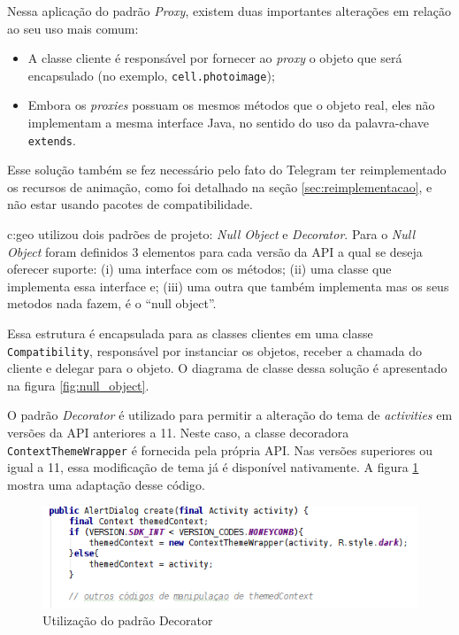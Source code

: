 Nessa aplicação do padrão \textit{Proxy}, existem duas importantes alterações em
relação ao seu uso mais comum:
\begin{itemize}
    \item A classe cliente é responsável por fornecer ao \textit{proxy} o objeto
        que será encapsulado (no exemplo, \texttt{cell.photoimage});
    \item Embora os \textit{proxies} possuam os mesmos métodos que o objeto real,
    eles não implementam a mesma interface Java, no sentido do uso da palavra-chave \texttt{extends}.
\end{itemize}

Esse solução também se fez necessário pelo fato do Telegram ter reimplementado os
recursos de animação, como foi detalhado na seção \ref{sec:reimplementacao},
e não estar usando pacotes de compatibilidade.

c:geo utilizou dois padrões de projeto: \textit{Null Object} e \textit{Decorator}.
Para o \textit{Null Object} foram definidos 3 elementos para cada versão da API
a qual se deseja oferecer suporte: (i) uma interface com os métodos; (ii) uma
classe que implementa essa interface e; (iii) uma outra que também implementa mas
os seus metodos nada fazem, é o “null object”.

Essa estrutura é encapsulada para as classes clientes em uma classe \texttt{Compatibility},
responsável por instanciar os objetos, receber a chamada do cliente e delegar para
o objeto. O diagrama de classe dessa solução é apresentado na figura \ref{fig:null_object}.

O padrão \textit{Decorator} é utilizado para permitir a alteração do tema de
\textit{activities} em versões da API anteriores a 11. Neste caso, a classe decoradora
\texttt{ContextThemeWrapper} é fornecida pela própria API. Nas versões superiores
ou igual a 11, essa modificação de tema já é disponível nativamente.
A figura \ref{fig:decorator} mostra uma adaptação desse código.
\begin{figure}[ht]
\centering
\includegraphics[width=1\textwidth]{imagens/decorator.png}
\caption{Utilização do padrão Decorator}
\label{fig:decorator}
\end{figure}


